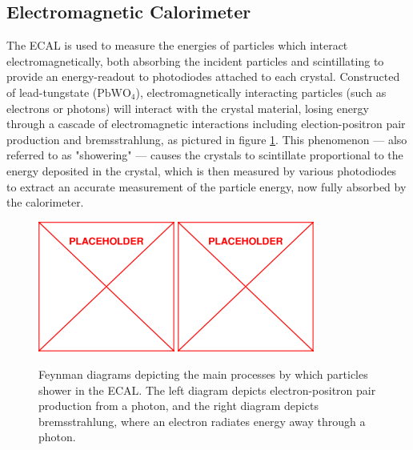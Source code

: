 \subsection{Electromagnetic Calorimeter}
\label{subsec:ecal}
The ECAL is used to measure the energies of particles which interact electromagnetically, both absorbing the incident particles and scintillating to provide an energy-readout to photodiodes attached to each crystal. Constructed of lead-tungstate ($\text{PbWO}_4$), electromagnetically interacting particles (such as electrons or photons) will interact with the crystal material, losing energy through a cascade of electromagnetic interactions including election-positron pair production and bremsstrahlung, as pictured in figure \ref{fig:ecalFeynman}. This phenomenon --- also referred to as "showering" --- causes the crystals to scintillate proportional to the energy deposited in the crystal, which is then measured by various photodiodes to extract an accurate measurement of the particle energy, now fully absorbed by the calorimeter.
\begin{figure}
	\centering
	\includegraphics[width=0.4\textwidth]{figs/placeholder}
	\includegraphics[width=0.4\textwidth]{figs/placeholder}
	\caption{Feynman diagrams depicting the main processes by which particles shower in the ECAL. The left diagram depicts electron-positron pair production from a photon, and the right diagram depicts bremsstrahlung, where an electron radiates energy away through a photon.}
	\label{fig:ecalFeynman}
\end{figure}

